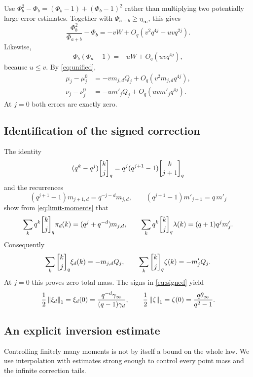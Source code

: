 Use \(\Phi_b^2-\Phi_b=(\Phi_b-1)+(\Phi_b-1)^2\) rather than
multiplying two potentially large error estimates. Together with
\(\Phi_{a+b}\ge\eta_\infty\), this gives
\[
 \frac{\Phi_b^2}{\Phi_{a+b}}-\Phi_b
   =-vW+O_q(v^2q^{4j}+uvq^{2j}).
\]
Likewise,
\[
 \Phi_b(\Phi_a-1)=-uW+O_q(uvq^{4j}),
\]
because \(u\le v\). By \eqref{eq:unified},
\begin{align}
 \mu_j-\mu_j^0
   &=-v m_{j,d}Q_j+O_q(v^2m_{j,d}q^{4j}),
       \label{eq:rank-moment-error}\\
 \nu_j-\nu_j^0
   &=-u m'_jQ_j+O_q(uvm'_jq^{4j}).
       \label{eq:defect-moment-error}
\end{align}
At \(j=0\) both errors are exactly zero.

\subsection{Identification of the signed correction}

The identity
\[
 (q^k-q^j)\qbin k j
    =q^j(q^{j+1}-1)\qbin{k}{j+1}
\]
and the recurrences
\[
 (q^{j+1}-1)m_{j+1,d}=q^{-j-d}m_{j,d},
 \qquad
 (q^{j+1}-1)m'_{j+1}=q\,m'_j
\]
show from \eqref{eq:limit-moments} that
\[
 \sum_k q^k\qbin k j\pi_d(k)=(q^j+q^{-d})m_{j,d},
 \qquad
 \sum_k q^k\qbin k j\lambda(k)=(q+1)q^jm'_j.
\]
Consequently
\begin{equation}\label{eq:signed-moments}
 \sum_k\qbin k j\xi_d(k)=-m_{j,d}Q_j,
 \qquad
 \sum_k\qbin k j\zeta(k)=-m'_jQ_j.
\end{equation}
At \(j=0\) this proves zero total mass. The signs in
\eqref{eq:signed} yield
\begin{equation}\label{eq:signed-norms}
 \frac12\left\|\xi_d\right\|_1
    =\xi_d(0)=\frac{q^{-d}\gamma_\infty}{(q-1)\gamma_d},
 \qquad
 \frac12\left\|\zeta\right\|_1
    =\zeta(0)=\frac{q\theta_\infty}{q^2-1}.
\end{equation}

\subsection{An explicit inversion estimate}

Controlling finitely many moments is not by itself a bound on the
whole law. We use interpolation with estimates strong enough to
control every point mass and the infinite correction tails.

